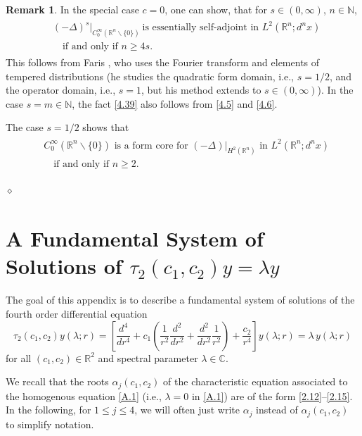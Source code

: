 \documentclass[reqno,11pt,centertags]{amsart}
\newcommand{\bbN}{{\mathbb{N}}}
\newcommand{\bbR}{{\mathbb{R}}}
\newcommand{\bbC}{{\mathbb{C}}}
\newcommand{\<}{\langle}
\renewcommand{\>}{\rangle}
\newcommand{\lb}{\label}
\numberwithin{equation}{section}
\theoremstyle{definition}
\newtheorem{remark}[theorem]{Remark}
\begin{document}
\begin{remark} \lb{r4.7} 
In the special case $c=0$, one can show, that for $s \in (0,\infty)$, $n\in\bbN$,
\begin{align}
\begin{split}
& (-\Delta)^s\big|_{C_0^{\infty}(\bbR^n \backslash \{0\})}\ \mbox{is essentially self-adjoint in $L^2( \bbR^n; d^nx)$}  \\
& \quad \text{if and only if $n \geq 4s$.}    \lb{4.39} 
\end{split}
\end{align} 
This follows from Faris \cite[p.~33--35]{Fa75}, who uses the Fourier transform and elements of tempered distributions (he studies the quadratic form domain, i.e., $s=1/2$, and the operator domain, i.e., $s=1$, but his method extends to $s \in (0,\infty)$). In the case $s = m \in \bbN$, the fact \eqref{4.39} also follows from \eqref{4.5} and \eqref{4.6}. 

The case $s=1/2$ shows that 
\begin{align}
\begin{split} 
& \text{$C_0^{\infty}(\bbR^n \backslash \{0\})$ is a form core for $(-\Delta)|_{H^2(\bbR^n)}$ in $L^2( \bbR^n; d^nx)$}   \\
& \quad \text{if and only if $n \geq 2$.}
\end{split} 
\end{align} 

\hfill $\diamond$ 
\end{remark}



\appendix
\section{A Fundamental System of Solutions of $\tau_2(c_1,c_2) y = \lambda y$} \lb{sA}

The goal of this appendix is to describe a fundamental system of solutions 
of the fourth order differential equation
\begin{equation} \lb{A.1}
\tau_2(c_1,c_2) y(\lambda;r) = 
\left[\frac{d^4}{dr^4} + c_1\left(\frac{1}{r^2}\frac{d^2}{dr^2} +\frac{d^2}{dr^2}\frac{1}{r^2}\right) +  \frac{c_2}{r^4}\right]y(\lambda;r) =\lambda\, y(\lambda;r)     
\end{equation}
for all $(c_1,c_2)\in \bbR^2$ and spectral parameter $\lambda \in \bbC$. 

We recall that the roots $\alpha_j(c_1,c_2)$ of the characteristic equation associated to the homogenous equation \eqref{A.1} (i.e., $\lambda=0$ in \eqref{A.1}) are of the form \eqref{2.12}--\eqref{2.15}. In the following, for $1\leq j\leq 4$, we will often just   write  $\alpha_j$ instead of $\alpha_j(c_1,c_2)$ to simplify notation.
\end{document}
